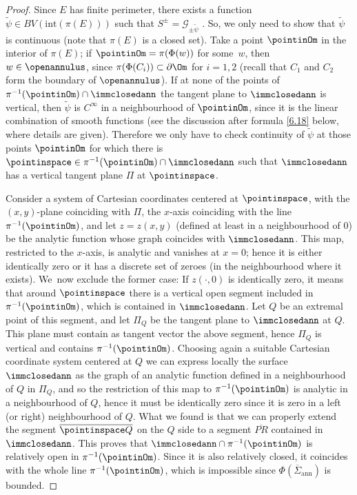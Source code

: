 \begin{proof}
Since $E$ has finite perimeter,
there exists a function $\widetilde \psi\in BV(\mathrm{int}(\pi(E)))$
such that
$
S^\pm=\mathcal G_{\pm\widetilde \psi}$ \cite{CCF}. So,
we only need to show that
$\widetilde\psi$ is continuous (note that $\pi(E)$ is a closed set).
Take a point $\pointinOm$ in the interior of $\pi(E)$; if $\pointinOm
=\pi(\Phi(w))$ for some~$w$, then $w\in \openannulus$, since
$\pi(\Phi(C_i)) \subset \partial \Om$
for $i=1,2$ (recall that $C_1$ and $C_2$ form the boundary of $\openannulus$).
If at none of the points of $\pi^{-1}(\pointinOm)\cap
\immclosedann$ the tangent plane to $\immclosedann$ is vertical,
then $\widetilde\psi$ is $C^\infty$ in a neighbourhood of $\pointinOm$,
since it is the linear combination of smooth functions
(see the discussion after formula \eqref{6.18} below, where details are given).
Therefore we only have to check continuity of $\widetilde\psi$
at those points $\pointinOm$ for which there is $\pointinspace\in
\pi^{-1}(\pointinOm)\cap\immclosedann$ such that
$\immclosedann$ has a vertical tangent plane $\Pi$ at $\pointinspace$.

Consider a system of Cartesian coordinates
centered at $ \pointinspace$, with the $(x,y)$-plane
coinciding with $\Pi$, the $x$-axis coinciding with the line $\pi^{-1}( \pointinOm)$,
and let $z=z(x,y)$ (defined at least in a neighbourhood of $0$) be the analytic function whose graph coincides with $\immclosedann$.
This map, restricted to the $x$-axis, is analytic and
vanishes at $x=0$; hence it is
either identically zero or it
has a discrete set of zeroes (in the neighbourhood where it exists). We~now exclude the former case: If $z(\cdot,0)$ is identically zero,
it means that around $\pointinspace$ there is a vertical open
segment included in $\pi^{-1}(\pointinOm)$,
which is
contained in $\immclosedann$. Let $Q$ be an extremal point of this segment, and
let $\Pi_Q$ be the tangent plane to $\immclosedann$ at $Q$.
This plane must
contain as tangent vector the above segment, hence $\Pi_Q$ is vertical and
contains $\pi^{-1}(\pointinOm)$.
Choosing again a suitable Cartesian coordinate system centered at $Q$
we can express locally
the surface $\immclosedann$ as the graph of an analytic function defined in a
neighbourhood of $Q$ in $\Pi_Q$, and so
the restriction of this map to
$\pi^{-1}(\pointinOm)$ is analytic in a neighbourhood of $Q$,
hence it must be identically zero since it is zero in a
left (or right) neighbourhood of $Q$.
What we found is that we can properly extend the segment $\overline{\pointinspace Q}$
on the $Q$ side to a segment $\overline{PR}$ contained in
$\immclosedann$.
This proves that $\immclosedann\cap \pi^{-1}(\pointinOm)$ is relatively open in $\pi^{-1}(\pointinOm)$. Since it is also relatively closed, it coincides with the whole line $\pi^{-1}(\pointinOm)$, which
is impossible since ${\Phi}(\overline\Sigma_\mathrm{ann})$ is bounded.


\end{proof}
